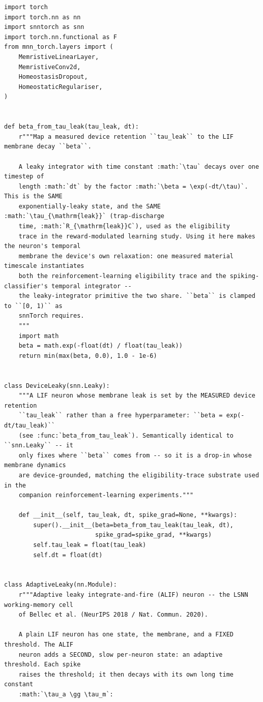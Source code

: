 \begin{lstlisting}[caption={mnn\_torch/models.py},label={lst:mnn-src-models}]
import torch
import torch.nn as nn
import snntorch as snn
import torch.nn.functional as F
from mnn_torch.layers import (
    MemristiveLinearLayer,
    MemristiveConv2d,
    HomeostasisDropout,
    HomeostaticRegulariser,
)


def beta_from_tau_leak(tau_leak, dt):
    r"""Map a measured device retention ``tau_leak`` to the LIF membrane decay ``beta``.

    A leaky integrator with time constant :math:`\tau` decays over one timestep of
    length :math:`dt` by the factor :math:`\beta = \exp(-dt/\tau)`. This is the SAME
    exponentially-leaky state, and the SAME :math:`\tau_{\mathrm{leak}}` (trap-discharge
    time, :math:`R_{\mathrm{leak}}C`), used as the eligibility
    trace in the reward-modulated learning study. Using it here makes the neuron's temporal
    membrane the device's own relaxation: one measured material timescale instantiates
    both the reinforcement-learning eligibility trace and the spiking-classifier's temporal integrator --
    the leaky-integrator primitive the two share. ``beta`` is clamped to ``[0, 1)`` as
    snnTorch requires.
    """
    import math
    beta = math.exp(-float(dt) / float(tau_leak))
    return min(max(beta, 0.0), 1.0 - 1e-6)


class DeviceLeaky(snn.Leaky):
    """A LIF neuron whose membrane leak is set by the MEASURED device retention
    ``tau_leak`` rather than a free hyperparameter: ``beta = exp(-dt/tau_leak)``
    (see :func:`beta_from_tau_leak`). Semantically identical to ``snn.Leaky`` -- it
    only fixes where ``beta`` comes from -- so it is a drop-in whose membrane dynamics
    are device-grounded, matching the eligibility-trace substrate used in the
    companion reinforcement-learning experiments."""

    def __init__(self, tau_leak, dt, spike_grad=None, **kwargs):
        super().__init__(beta=beta_from_tau_leak(tau_leak, dt),
                         spike_grad=spike_grad, **kwargs)
        self.tau_leak = float(tau_leak)
        self.dt = float(dt)


class AdaptiveLeaky(nn.Module):
    r"""Adaptive leaky integrate-and-fire (ALIF) neuron -- the LSNN working-memory cell
    of Bellec et al. (NeurIPS 2018 / Nat. Commun. 2020).

    A plain LIF neuron has one state, the membrane, and a FIXED threshold. The ALIF
    neuron adds a SECOND, slow per-neuron state: an adaptive threshold. Each spike
    raises the threshold; it then decays with its own long time constant
    :math:`\tau_a \gg \tau_m`:


\end{lstlisting}
